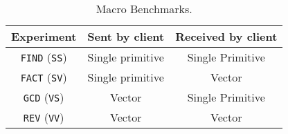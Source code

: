 \documentclass{sig-alternate}
\begin{document}
\begin{table}[t]

  \begin{center}
  \begin{tabular}{| c | c | c |}
  \hline
  Experiment & Sent by client & Received by client \\
  \hline
  \texttt{FIND} ({\tt SS}) & Single primitive & Single Primitive \\
  \texttt{FACT} ({\tt SV}) & Single primitive & Vector \\
  \texttt{GCD}  ({\tt VS}) & Vector & Single Primitive \\
  \texttt{REV}  ({\tt VV}) & Vector & Vector \\
  \hline
  \end{tabular}
\end{center}

  \vspace*{-.1in}
  \caption{Macro Benchmarks.}\label{tab:realworlds}
  \vspace*{-.2in}

\end{table}


\end{document}
